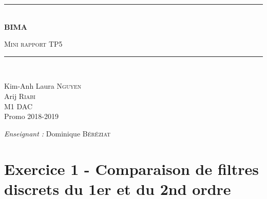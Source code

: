 \documentclass[a4paper]{article}
\newcommand{\HRule}{\rule{\linewidth}{0.5mm}}
\begin{document}
\begin{titlepage}
  \begin{center}


      \vspace{4cm}
    \HRule \\[0.4cm]
    { \huge \bfseries BIMA\\[0.4cm] }

      \textsc{\LARGE Mini rapport TP5}\\[0.4cm]

    \HRule \\[0.8cm]

    \begin{minipage}{0.4\textwidth}
      \begin{flushleft} \large
        Kim-Anh Laura \textsc{Nguyen}\\
        \large
        Arij \textsc{Riabi}\\
        M1 DAC\\
        Promo 2018-2019 \\
      \end{flushleft}
    \end{minipage}
    \begin{minipage}{0.5\textwidth}
      \begin{flushright} \large
        \emph{Enseignant :} Dominique \textsc{Béréziat}\\
      \end{flushright}
    \end{minipage}

      \vspace{2cm}

  \end{center}
\end{titlepage}

\newpage

\section*{Exercice 1 - Comparaison de filtres discrets du 1er et du 2nd ordre}
\end{document}
